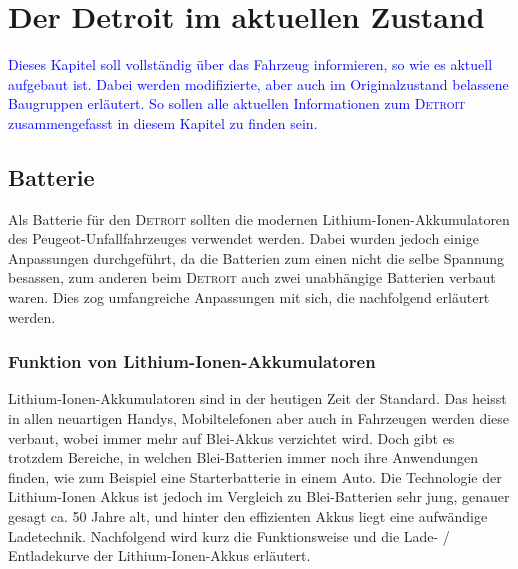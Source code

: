 \chapter{Der Detroit im aktuellen Zustand}\label{aktuell}

\textcolor{blue}{Dieses Kapitel soll vollständig über das Fahrzeug informieren, so wie es aktuell aufgebaut ist. Dabei werden modifizierte, aber auch im Originalzustand belassene Baugruppen erläutert. So sollen alle aktuellen Informationen zum \textsc{Detroit} zusammengefasst in diesem Kapitel zu finden sein.}

\section{Batterie}
Als Batterie für den \textsc{Detroit} sollten die modernen Lithium-Ionen-Akkumulatoren des Peugeot-Unfallfahrzeuges verwendet werden. Dabei wurden jedoch einige Anpassungen durchgeführt, da die Batterien zum einen nicht die selbe Spannung besassen, zum anderen beim \textsc{Detroit} auch zwei unabhängige Batterien verbaut waren. Dies zog umfangreiche Anpassungen mit sich, die nachfolgend erläutert werden.

\subsection{Funktion von Lithium-Ionen-Akkumulatoren} \label{kap_liion}

Lithium-Ionen-Akkumulatoren sind in der heutigen Zeit der Standard. Das heisst in allen neuartigen Handys, Mobiltelefonen aber auch in Fahrzeugen werden diese verbaut, wobei immer mehr auf Blei-Akkus verzichtet wird. Doch gibt es trotzdem Bereiche, in welchen Blei-Batterien immer noch ihre Anwendungen finden, wie zum Beispiel eine Starterbatterie in einem Auto. Die Technologie der Lithium-Ionen Akkus ist jedoch im Vergleich zu Blei-Batterien sehr jung, genauer gesagt ca. 50 Jahre alt, und hinter den effizienten Akkus liegt eine aufwändige Ladetechnik. Nachfolgend wird kurz die Funktionsweise und die Lade- / Entladekurve der Lithium-Ionen-Akkus erläutert.

